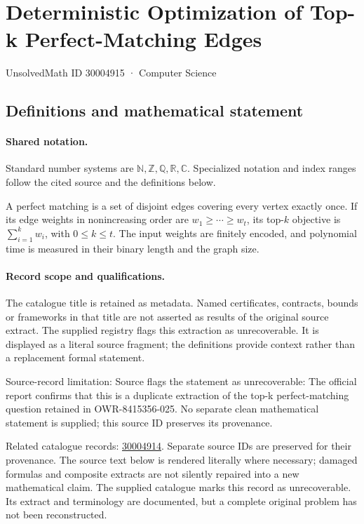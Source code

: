 \documentclass[11pt]{article}
\begin{document}
\setcounter{section}{30004914}
\section{Deterministic Optimization of Top-k Perfect-Matching Edges}\label{30004915}
{\small\sffamily UnsolvedMath ID 30004915 · Computer Science}
\subsection{Definitions and mathematical statement}

\paragraph{Shared notation.}Standard number systems are $\mathbb N,\mathbb Z,\mathbb Q,\mathbb R,\mathbb C$. Specialized notation and index ranges follow the cited source and the definitions below.


A perfect matching is a set of disjoint edges covering every vertex exactly once. If its edge weights in nonincreasing order are $w_1\geq\cdots\geq w_t$, its top-$k$ objective is $\sum_{i=1}^kw_i$, with $0\leq k\leq t$. The input weights are finitely encoded, and polynomial time is measured in their binary length and the graph size.
\paragraph{Record scope and qualifications.}
The catalogue title is retained as metadata. Named certificates, contracts, bounds or frameworks in that title are not asserted as results of the original source extract.
The supplied registry flags this extraction as unrecoverable. It is displayed as a literal source fragment; the definitions provide context rather than a replacement formal statement.

Source-record limitation: Source flags the statement as unrecoverable: The official report confirms that this is a duplicate extraction of the top-k perfect-matching question retained in OWR-8415356-025. No separate clean mathematical statement is supplied; this source ID preserves its provenance.

Related catalogue records: \href{https://mehmetmars7.github.io/Erdosproblems-llm-hunter/problem.html?type=open_problems&id=30004914}{30004914}. Separate source IDs are preserved for their provenance.
The source text below is rendered literally where necessary; damaged formulas and composite extracts are not silently repaired into a new mathematical claim.
The supplied catalogue marks this record as unrecoverable. Its extract and terminology are documented, but a complete original problem has not been reconstructed.
\end{document}
